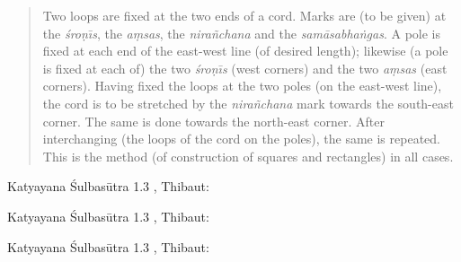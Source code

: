 \documentclass{article}
\begin{document}
\begin{quote}
Two loops are fixed at the two ends of a cord. Marks are (to be given) at the
{\em \'sro\d{n}{\=\i}s}, the {\em a\d{m}sas}, the {\em nira\~nchana} and the
{\em sam\=asabha\.{n}gas}. A pole is fixed at each end of the east-west line (of desired length); likewise
(a pole is fixed at each of) the two {\em \'sro\d{n}{\=\i}s} (west corners) and the two
{\em a\d{m}sas} (east corners). Having fixed the loops at the two poles (on the east-west line),
the cord is to be stretched by the {\em nira\~nchana} mark towards the south-east corner. The same
is done towards the north-east corner. After interchanging (the loops of the 
cord on the poles), the same is repeated. This is the method (of construction
of squares and rectangles) in all cases.
\end{quote}

Katyayana \'Sulbas\=utra 1.3 \cite[p.~99]{thibaut1882}, Thibaut:

\begin{quote}

\end{quote}

Katyayana \'Sulbas\=utra 1.3 \cite[p.~99]{thibaut1882}, Thibaut:

\begin{quote}

\end{quote}

Katyayana \'Sulbas\=utra 1.3 \cite[p.~99]{thibaut1882}, Thibaut:

\begin{quote}

\end{quote}

\nocite{*}



\end{document}
